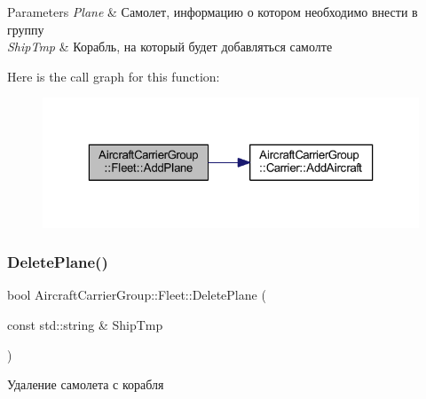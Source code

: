 \begin{DoxyParams}{Parameters}
{\em Plane} & Самолет, информацию о котором необходимо внести в группу \\
\hline
{\em Ship\+Tmp} & Корабль, на который будет добавляться самолте \\
\hline
\end{DoxyParams}
Here is the call graph for this function\+:
\nopagebreak
\begin{figure}[H]
\begin{center}
\leavevmode
\includegraphics[width=323pt]{class_aircraft_carrier_group_1_1_fleet_af7863ad9b057b0212b04019956254e8a_cgraph}
\end{center}
\end{figure}
\mbox{\label{class_aircraft_carrier_group_1_1_fleet_aa464eecb22e71128b6a01733d71fc27e}} 
\subsubsection{\texorpdfstring{Delete\+Plane()}{DeletePlane()}}
{\footnotesize\ttfamily bool Aircraft\+Carrier\+Group\+::\+Fleet\+::\+Delete\+Plane (\begin{DoxyParamCaption}\item[{const std\+::string \&}]{Ship\+Tmp }\end{DoxyParamCaption})}



Удаление самолета с корабля 


